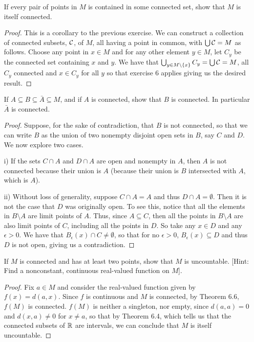 \begin{exercise}{7}
If every pair of points in $M$ is contained in some connected set, show that $M$ is itself connected.
\end{exercise}
\begin{proof}
This is a corollary to the previous exercise.
We can construct a collection of connected subsets, $\mathcal{C}$, of $M$, all having a point in common, with $\bigcup\mathcal{C}=M$ as follows.
Choose any point in $x\in M$ and for any other element $y\in M$, let $C_y$ be the connected set containing $x$ and $y$.
We have that $\bigcup_{y\in M\setminus\{x\}}C_y =\bigcup\mathcal{C} =M$, all $C_y$ connected and $x\in C_y$ for all $y$ so that exercise 6 applies giving us the desired result.
\end{proof} 

\begin{exercise}{9}
If $A \subseteq B \subseteq \bar{A} \subseteq M$, and if $A$ is connected, show that $B$ is connected.
In particular $\bar{A}$ is connected.
\end{exercise}
\begin{proof}
Suppose, for the sake of contradiction, that $B$ is not connected, so that we can write $B$ as the union of two nonempty disjoint open sets in $B$, say $C$ and $D$.
We now explore two cases.

i) If the sets $C\cap A$ and $D\cap A$ are open and nonempty in $A$, then $A$ is not connected because their union is $A$ (because their union is $B$ intersected with $A$, which is $A$).

ii) Without loss of generality, suppose $C\cap A=A$ and thus $D\cap A=\emptyset$. 
Then it is not the case that $D$ was originally open.
To see this, notice that all the elements in $B\setminus A$ are limit points of $A$.
Thus, since $A\subseteq C$, then all the points in $B\setminus A$ are also limit points of $C$, including all the points in $D$.
So take any $x\in D$ and any $\epsilon>0$. 
We have that $B_\epsilon(x)\cap C\neq\emptyset$, so that for no $\epsilon>0$, $B_\epsilon(x)\subseteq D$ and thus $D$ is not open, giving us a contradiction.
\end{proof} 

\begin{exercise}{12}
If $M$ is connected and has at least two points, show that $M$ is uncountable.
[Hint: Find a nonconstant, continuous real-valued function on $M$].
\end{exercise}
\begin{proof}
Fix $a\in M$ and consider the real-valued function given by $f(x)=d(a,x)$.
Since $f$ is continuous and $M$ is connected, by Theorem 6.6, $f(M)$ is connected.
$f(M)$ is neither a singleton, nor empty, since $d(a,a)=0$ and $d(x,a)\neq 0$ for $x\neq a$, so that by Theorem 6.4, which tells us that the connected subsets of $\mathbb{R}$ are intervals, we can conclude that $M$ is itself uncountable.
\end{proof} 

